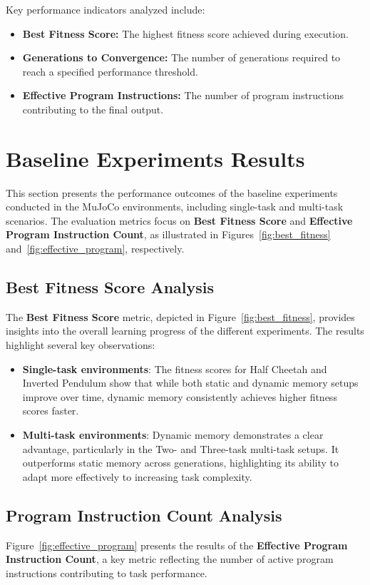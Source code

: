 \documentclass[sigconf]{acmart}
\begin{document}
Key performance indicators analyzed include:

\begin{itemize}
  \item \textbf{Best Fitness Score:} The highest fitness score achieved during execution.
  \item \textbf{Generations to Convergence:} The number of generations required to reach a specified performance threshold.
  \item \textbf{Effective Program Instructions:} The number of program instructions contributing to the final output.
\end{itemize}

\section{Baseline Experiments Results}
\label{sec:experiments}
This section presents the performance outcomes of the baseline experiments conducted in 
the MuJoCo environments, including single-task and multi-task scenarios. The evaluation 
metrics focus on \textbf{Best Fitness Score} and \textbf{Effective Program Instruction Count}, as illustrated in 
Figures~\ref{fig:best_fitness} and~\ref{fig:effective_program}, respectively.

\subsection{Best Fitness Score Analysis}
The \textbf{Best Fitness Score} metric, depicted in Figure~\ref{fig:best_fitness}, provides insights into the overall 
learning progress of the different experiments. The results highlight several key observations:

\begin{itemize}
  \item \textbf{Single-task environments}: The fitness scores for Half Cheetah and Inverted Pendulum show that while both static and dynamic memory setups improve over time, dynamic memory consistently achieves higher fitness scores faster.
  \item \textbf{Multi-task environments}: Dynamic memory demonstrates a clear advantage, particularly in the Two- and Three-task multi-task setups. It outperforms static memory across generations, highlighting its ability to adapt more effectively to increasing task complexity.
\end{itemize}

\subsection{Program Instruction Count Analysis}
Figure~\ref{fig:effective_program} presents the results of the \textbf{Effective Program Instruction Count}, a key metric reflecting the number of active 
program instructions contributing to task performance.
\end{document}
